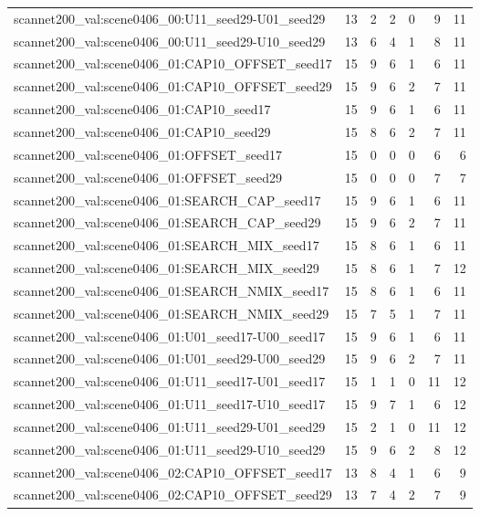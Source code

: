 \begin{table}[t]
\begin{tabular}{lrrrrrr}
scannet200\_val:scene0406\_00:U11\_seed29-U01\_seed29 & 13 & 2 & 2 & 0 & 9 & 11 \\
scannet200\_val:scene0406\_00:U11\_seed29-U10\_seed29 & 13 & 6 & 4 & 1 & 8 & 11 \\
scannet200\_val:scene0406\_01:CAP10\_OFFSET\_seed17 & 15 & 9 & 6 & 1 & 6 & 11 \\
scannet200\_val:scene0406\_01:CAP10\_OFFSET\_seed29 & 15 & 9 & 6 & 2 & 7 & 11 \\
scannet200\_val:scene0406\_01:CAP10\_seed17 & 15 & 9 & 6 & 1 & 6 & 11 \\
scannet200\_val:scene0406\_01:CAP10\_seed29 & 15 & 8 & 6 & 2 & 7 & 11 \\
scannet200\_val:scene0406\_01:OFFSET\_seed17 & 15 & 0 & 0 & 0 & 6 & 6 \\
scannet200\_val:scene0406\_01:OFFSET\_seed29 & 15 & 0 & 0 & 0 & 7 & 7 \\
scannet200\_val:scene0406\_01:SEARCH\_CAP\_seed17 & 15 & 9 & 6 & 1 & 6 & 11 \\
scannet200\_val:scene0406\_01:SEARCH\_CAP\_seed29 & 15 & 9 & 6 & 2 & 7 & 11 \\
scannet200\_val:scene0406\_01:SEARCH\_MIX\_seed17 & 15 & 8 & 6 & 1 & 6 & 11 \\
scannet200\_val:scene0406\_01:SEARCH\_MIX\_seed29 & 15 & 8 & 6 & 1 & 7 & 12 \\
scannet200\_val:scene0406\_01:SEARCH\_NMIX\_seed17 & 15 & 8 & 6 & 1 & 6 & 11 \\
scannet200\_val:scene0406\_01:SEARCH\_NMIX\_seed29 & 15 & 7 & 5 & 1 & 7 & 11 \\
scannet200\_val:scene0406\_01:U01\_seed17-U00\_seed17 & 15 & 9 & 6 & 1 & 6 & 11 \\
scannet200\_val:scene0406\_01:U01\_seed29-U00\_seed29 & 15 & 9 & 6 & 2 & 7 & 11 \\
scannet200\_val:scene0406\_01:U11\_seed17-U01\_seed17 & 15 & 1 & 1 & 0 & 11 & 12 \\
scannet200\_val:scene0406\_01:U11\_seed17-U10\_seed17 & 15 & 9 & 7 & 1 & 6 & 12 \\
scannet200\_val:scene0406\_01:U11\_seed29-U01\_seed29 & 15 & 2 & 1 & 0 & 11 & 12 \\
scannet200\_val:scene0406\_01:U11\_seed29-U10\_seed29 & 15 & 9 & 6 & 2 & 8 & 12 \\
scannet200\_val:scene0406\_02:CAP10\_OFFSET\_seed17 & 13 & 8 & 4 & 1 & 6 & 9 \\
scannet200\_val:scene0406\_02:CAP10\_OFFSET\_seed29 & 13 & 7 & 4 & 2 & 7 & 9 \\

\end{tabular}
\end{table}

